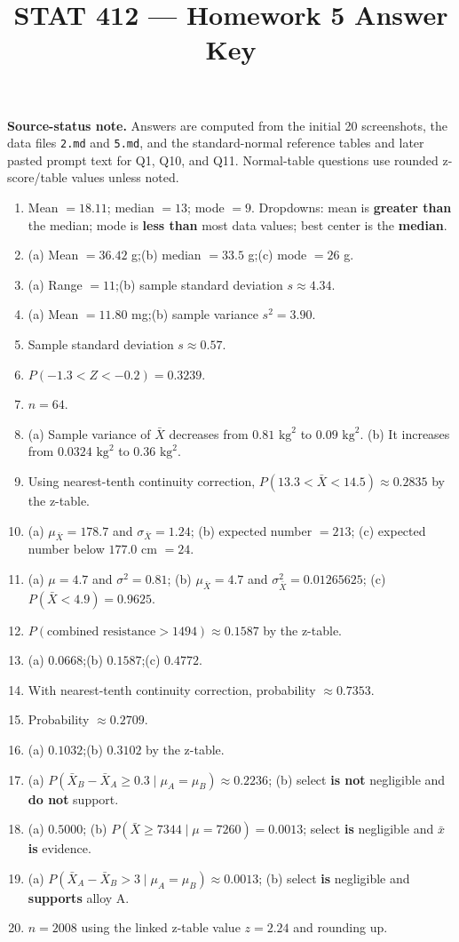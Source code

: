 \documentclass[11pt]{article}
\title{STAT 412 --- Homework 5 Answer Key}
\author{}
\date{}
\begin{document}
\maketitle

\noindent\textbf{Source-status note.} Answers are computed from the initial
20 screenshots, the data files \texttt{2.md} and \texttt{5.md}, and the
standard-normal reference tables and later pasted prompt text for Q1, Q10, and
Q11. Normal-table questions use rounded z-score/table values unless noted.

\begin{enumerate}[leftmargin=*,label=\textbf{\arabic*.}]
\item Mean $=18.11$; median $=13$; mode $=9$. Dropdowns: mean is
\textbf{greater than} the median; mode is \textbf{less than} most data values;
best center is the \textbf{median}.
\item (a) Mean $=36.42$ g;\quad (b) median $=33.5$ g;\quad (c) mode $=26$ g.
\item (a) Range $=11$;\quad (b) sample standard deviation $s\approx4.34$.
\item (a) Mean $=11.80$ mg;\quad (b) sample variance $s^2=3.90$.
\item Sample standard deviation $s\approx0.57$.
\item $P(-1.3<Z<-0.2)=0.3239$.
\item $n=64$.
\item (a) Sample variance of $\bar X$ decreases from $0.81\text{ kg}^2$ to
$0.09\text{ kg}^2$.\quad
(b) It increases from $0.0324\text{ kg}^2$ to $0.36\text{ kg}^2$.
\item Using nearest-tenth continuity correction,
$P(13.3<\bar X<14.5)\approx0.2835$ by the z-table.
\item (a) $\mu_{\bar X}=178.7$ and $\sigma_{\bar X}=1.24$;\quad
(b) expected number $=213$;\quad
(c) expected number below $177.0$ cm $=24$.
\item (a) $\mu=4.7$ and $\sigma^2=0.81$;\quad
(b) $\mu_{\bar X}=4.7$ and $\sigma_{\bar X}^2=0.01265625$;\quad
(c) $P(\bar X<4.9)=0.9625$.
\item $P(\text{combined resistance}>1494)\approx0.1587$ by the z-table.
\item (a) $0.0668$;\quad (b) $0.1587$;\quad (c) $0.4772$.
\item With nearest-tenth continuity correction, probability $\approx0.7353$.
\item Probability $\approx0.2709$.
\item (a) $0.1032$;\quad (b) $0.3102$ by the z-table.
\item (a) $P(\bar X_B-\bar X_A\ge0.3\mid\mu_A=\mu_B)\approx0.2236$;\quad
(b) select \textbf{is not} negligible and \textbf{do not} support.
\item (a) $0.5000$;\quad
(b) $P(\bar X\ge7344\mid\mu=7260)=0.0013$; select \textbf{is} negligible and
$\bar x$ \textbf{is} evidence.
\item (a) $P(\bar X_A-\bar X_B>3\mid\mu_A=\mu_B)\approx0.0013$;\quad
(b) select \textbf{is} negligible and \textbf{supports} alloy A.
\item $n=2008$ using the linked z-table value $z=2.24$ and rounding up.
\end{enumerate}
\end{document}
